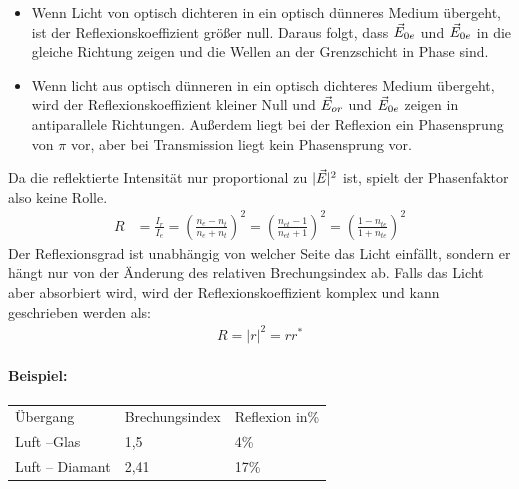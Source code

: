  \begin{itemize}
 	\item Wenn Licht von optisch dichteren in ein optisch dünneres Medium übergeht, ist der Reflexionskoeffizient größer null.
 	Daraus folgt, dass $\vec{E}_{0e}$ und $\vec{E}_{0e}$ in die gleiche Richtung zeigen und die Wellen an der Grenzschicht in Phase sind.
 	\item Wenn licht aus optisch dünneren in ein optisch dichteres Medium übergeht, wird der Reflexionskoeffizient kleiner Null und $\vec{E}_{or}$ und $\vec{E}_{0e}$ zeigen in antiparallele Richtungen. Außerdem liegt bei der Reflexion ein Phasensprung von $\pi$ vor, aber bei Transmission liegt kein Phasensprung vor.
 \end{itemize}
 Da die reflektierte Intensität nur proportional zu $\vert\vec{E}\vert^2$ ist, spielt der Phasenfaktor also keine Rolle.
 \begin{align*}
 	R&= \frac{I_r}{I_e}=\left(\frac{n_e-n_t}{n_e+n_t}\right)^2=\left(\frac{n_{et}-1}{n_{et}+1}\right)^2=\left(\frac{1-n_{te}}{1+n_{te}}\right)^2
 \end{align*}
 Der Reflexionsgrad ist unabhängig von welcher Seite das Licht einfällt, sondern er hängt nur von der Änderung des relativen Brechungsindex ab. Falls das Licht aber absorbiert wird, wird der Reflexionskoeffizient komplex und kann geschrieben werden als:
 \begin{align*}
 	R=\vert r\vert^2=rr^*
 \end{align*}
 \paragraph{Beispiel:} 
 \begin{tabular}{lll}
 	Übergang&Brechungsindex&Reflexion in\%\\
 	Luft --Glas&1,5&4\%\\
 	Luft -- Diamant&2,41&17\%
 \end{tabular}
 

